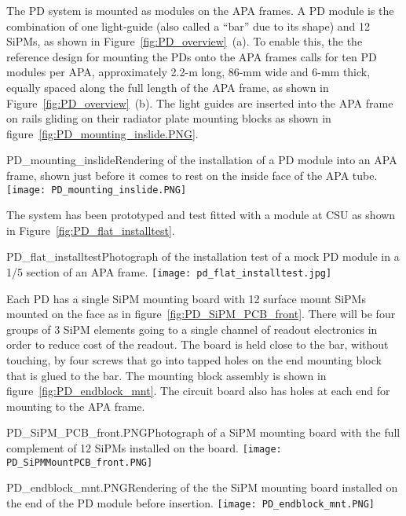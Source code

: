 
The PD system is mounted as modules on the APA frames.  A PD module is
the combination of one light-guide (also called a ``bar'' due to its
shape) and 12 SiPMs, as shown in Figure~\ref{fig:PD_overview}~(a).  To
enable this, the the reference design for mounting the PDs onto the
APA frames calls for ten PD modules per APA, approximately 2.2-m long,
86-mm wide and 6-mm thick, equally spaced along the full length of the
APA frame, as shown in Figure~\ref{fig:PD_overview}~(b). 
The light guides are inserted into the APA frame on rails gliding on their radiator
plate mounting blocks as shown in figure~\ref{fig:PD_mounting_inslide.PNG}.
\begin{cdrfigure}
  {PD_mounting_inslide}{Rendering of the installation of a PD module
    into an APA frame, shown just before it comes to rest on the inside face
    of the APA tube.}
\texttt{[image: PD\_mounting\_inslide.PNG]}
\end{cdrfigure}

The system has been prototyped and test fitted with a module at CSU 
as shown in Figure~\ref{fig:PD_flat_installtest}.
\begin{cdrfigure}
  {PD_flat_installtest}{Photograph of the installation
    test of a mock PD module in a 1/5 section of an APA frame.}
\texttt{[image: pd\_flat\_installtest.jpg]}
\end{cdrfigure}


Each PD has a single SiPM mounting board with 12 surface mount SiPMs 
mounted on the face as in figure~\ref{fig:PD_SiPM_PCB_front}.
There will be four groups of $3$ SiPM elements going to a single 
channel of readout electronics in order to reduce cost of the readout.
The board is held close to the bar, without touching, by four screws that go into 
tapped holes on the end  mounting block that is glued to the bar.  
The mounting block assembly is shown in figure~\ref{fig:PD_endblock_mnt}.
The circuit board also has holes at each end for mounting to the APA frame.  
\begin{cdrfigure}
  {PD_SiPM_PCB_front.PNG}{Photograph of a SiPM mounting board
    with the full complement of 12 SiPMs installed on the board.}
\texttt{[image: PD\_SiPMMountPCB\_front.PNG]}
\end{cdrfigure}
\begin{cdrfigure}
  {PD_endblock_mnt.PNG}{Rendering of the the SiPM mounting board
    installed on the end of the PD module before insertion.}
\texttt{[image: PD\_endblock\_mnt.PNG]}
\end{cdrfigure}

